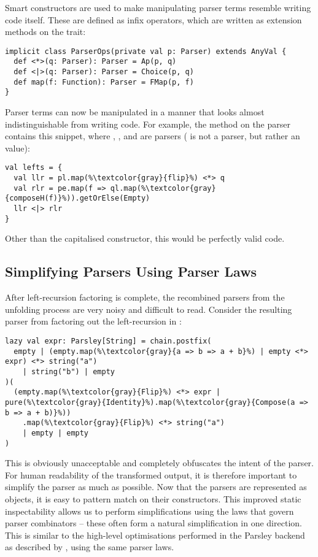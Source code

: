 \documentclass[../../main.tex]{subfiles}
\begin{document}
Smart constructors are used to make manipulating parser terms resemble writing  code itself.
These are defined as infix operators, which are written as extension methods on the  trait:
\begin{verbatim}
implicit class ParserOps(private val p: Parser) extends AnyVal {
  def <*>(q: Parser): Parser = Ap(p, q)
  def <|>(q: Parser): Parser = Choice(p, q)
  def map(f: Function): Parser = FMap(p, f)
}
\end{verbatim}
%
Parser terms can now be manipulated in a manner that looks almost indistinguishable from writing  code.
For example, the  method on the  parser contains this snippet, where , , and  are parsers ( is not a parser, but rather an  value):
\begin{verbatim}
val lefts = {
  val llr = pl.map(%\textcolor{gray}{flip}%) <*> q
  val rlr = pe.map(f => ql.map(%\textcolor{gray}{composeH(f)}%)).getOrElse(Empty)
  llr <|> rlr
}
\end{verbatim}
Other than the capitalised  constructor, this would be perfectly valid  code.

\subsection{Simplifying Parsers Using Parser Laws}\label{sec:simplify-parsers}
After left-recursion factoring is complete, the recombined parsers from the unfolding process are very noisy and difficult to read.
Consider the resulting parser from factoring out the left-recursion in :
\begin{verbatim}
lazy val expr: Parsley[String] = chain.postfix(
  empty | (empty.map(%\textcolor{gray}{a => b => a + b}%) | empty <*> expr) <*> string("a")
    | string("b") | empty
)(
  (empty.map(%\textcolor{gray}{Flip}%) <*> expr | pure(%\textcolor{gray}{Identity}%).map(%\textcolor{gray}{Compose(a => b => a + b)}%))
    .map(%\textcolor{gray}{Flip}%) <*> string("a")
    | empty | empty
)
\end{verbatim}
%
This is obviously unacceptable and completely obfuscates the intent of the parser.
For human readability of the transformed output, it is therefore important to simplify the parser as much as possible.
Now that the parsers are represented as objects, it is easy to pattern match on their constructors.
This improved static inspectability allows us to perform simplifications using the laws that govern parser combinators -- these often form a natural simplification in one direction.
This is similar to the high-level optimisations performed in the Parsley backend as described by \textcite{willis_staged_2023}, using the same parser laws.
\end{document}
